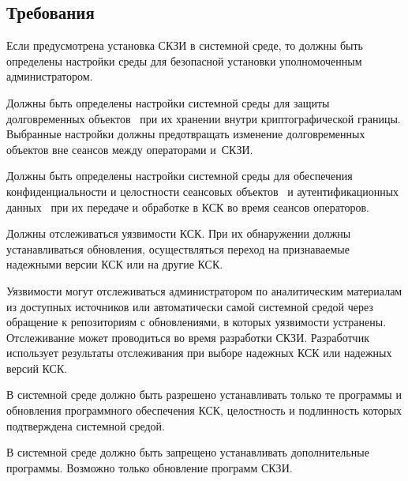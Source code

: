 \subsection{Требования}\label{ES.Reqs}

\label{R.ES.Install} %
Если предусмотрена установка СКЗИ в системной среде, то должны быть определены
настройки среды для безопасной установки уполномоченным администратором.

\label{R.ES.Objects} %
Должны быть определены настройки системной среды для защиты долговременных
объектов~ при их хранении внутри криптографической границы.
%
Выбранные настройки должны предотвращать изменение долговременных объектов вне
сеансов между операторами и~СКЗИ.

\label{R.ES.Session} %
Должны быть определены настройки системной среды для обеспечения
конфиденциальности и целостности сеансовых объектов~ и
аутентификационных данных~ при их передаче и  обработке в
КСК во время сеансов операторов.

\label{R.ES.CVE} %
Должны отслеживаться уязвимости КСК. При их обнаружении должны устанавливаться
обновления, осуществляться переход на признаваемые надежными версии КСК или на
другие КСК.

\begin{note*}
Уязвимости могут отслеживаться администратором по аналитическим материалам из
доступных источников или автоматически самой системной средой через обращение к
репозиториям с обновлениями, в которых уязвимости устранены.
%
Отслеживание может проводиться во время разработки СКЗИ. Разработчик использует
результаты отслеживания при выборе надежных КСК или надежных версий КСК.
\end{note*}

\label{R.ES.AuthCode} %
В системной среде должно быть разрешено устанавливать только те программы и
обновления программного обеспечения КСК, целостность и подлинность которых
подтверждена системной средой.

\label{R.ES.NoCode} %
В системной среде должно быть запрещено устанавливать дополнительные программы.
Возможно только обновление программ СКЗИ.

